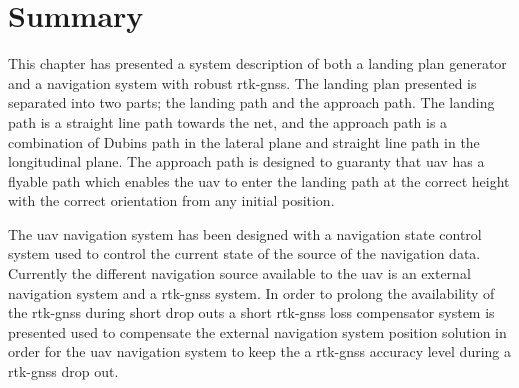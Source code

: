 \section{Summary}
This chapter has presented a system description of both a landing plan generator and a navigation system with robust \gls{rtk-gnss}. The landing plan presented is separated into two parts; the landing path and the approach path. The landing path is a straight line path towards the net, and the approach path is a combination of Dubins path in the lateral plane and straight line path in the longitudinal plane. The approach path is designed to guaranty that \gls{uav} has a flyable path which enables the \gls{uav} to enter the landing path at the correct height with the correct orientation from any initial position.

The \gls{uav} navigation system has been designed with a navigation state control system used to control the current state of the source of the navigation data. Currently the different navigation source available to the \gls{uav} is an external navigation system and a \gls{rtk-gnss} system. In order to prolong the availability of the \gls{rtk-gnss} during short drop outs a short \gls{rtk-gnss} loss compensator system is presented used to compensate the external navigation system position solution in order for the \gls{uav} navigation system to keep the a \gls{rtk-gnss} accuracy level during a \gls{rtk-gnss} drop out.